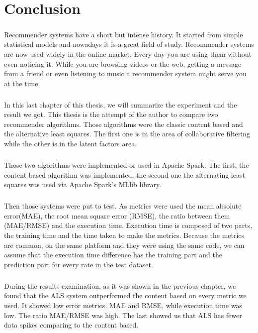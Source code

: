 \newpage
\chapter{Conclusion}
\paragraph{}Recommender systems have a short but intense history. It started from simple statistical models and nowadays it is a great field of study. Recommender systems are now used widely in the online market. Every day you are using them without even noticing it. While you are browsing videos or the web, getting a message from a friend or even listening to music a recommender system might serve you at the time.

\paragraph{} In this last chapter of this thesis, we will summarize the experiment and the result we got. This thesis is the attempt of the author to compare two recommender algorithms. Those algorithms were the classic content based and the alternative least squares. The first one is in the area of collaborative filtering while the other is in the latent factors area.

\paragraph{} Those two algorithms were implemented or used in Apache Spark. The first, the content based algorithm was implemented, the second one the alternating least squares was used via Apache Spark's MLlib library.

\paragraph{} Then those systems were put to test. As metrics were used the mean absolute error(MAE), the root mean square error (RMSE), the ratio between them (MAE/RMSE) and the execution time. Execution time is composed of two parts, the training time and the time taken to make the metrics. Because the metrics are common, on the same platform and they were using the same code, we can assume that the execution time difference has the training part and the prediction part for every rate in the test dataset.

\paragraph{} During the results examination, as it was shown in the previous chapter, we found that the ALS system outperformed the content based on every metric we used. It showed low error metrics, MAE and RMSE, while execution time was low. The ratio MAE/RMSE was high. The last showed us that ALS has fewer data spikes comparing to the content based.

